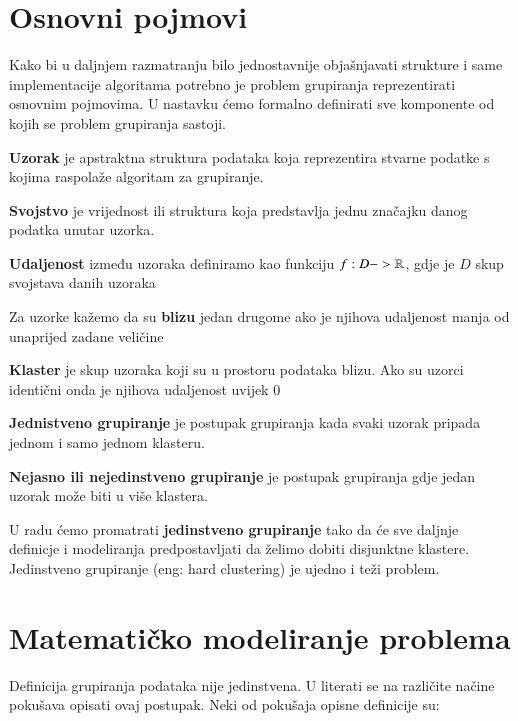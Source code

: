 \documentclass[a4paper,twoside,12pt]{memoir} %
\begin{document}
\section[Osnovni pojmovi][os-pojmovi]{Osnovni pojmovi}
\label{sec:os-pojmovi}
Kako bi u daljnjem razmatranju bilo jednostavnije objašnjavati strukture i same implementacije algoritama potrebno je problem grupiranja reprezentirati osnovnim pojmovima. U nastavku ćemo formalno definirati sve komponente od kojih se problem grupiranja sastoji.
\begin{defn}
\label{def:uzorak}
\textbf{Uzorak} je apstraktna struktura podataka koja reprezentira stvarne podatke s kojima raspolaže algoritam za grupiranje.
\end{defn}
\begin{defn}
\label{def:svojstvo}
\textbf{Svojstvo} je vrijednost ili struktura koja predstavlja jednu značajku danog podatka unutar uzorka.
\end{defn}
\begin{defn}
\label{def:udaljenost}
\textbf{Udaljenost} između uzoraka definiramo kao funkciju 
$f: D  -> \mathbb{R}$, gdje je $D$ skup svojstava danih uzoraka
\end{defn}
\begin{defn}
\label{def:blizina}
Za uzorke kažemo da su \textbf{blizu} jedan drugome ako je njihova udaljenost manja od unaprijed zadane veličine
\end{defn}
\begin{defn}
\label{def:klaster}
\textbf{Klaster} je skup uzoraka koji su u prostoru podataka blizu. Ako su uzorci identični onda je njihova udaljenost uvijek $0$
\end{defn}
\begin{defn}
\label{def:hard}
\textbf{Jednistveno grupiranje} je postupak grupiranja kada svaki uzorak pripada jednom i samo jednom klasteru.
\end{defn}
\begin{defn}
\label{def:fuzzy}
\textbf{Nejasno ili nejedinstveno grupiranje} je postupak grupiranja gdje jedan uzorak može biti u više klastera.
\end{defn}
\begin{rem}
U radu ćemo promatrati \textbf{jedinstveno grupiranje} tako da će sve daljnje definicje i modeliranja predpostavljati da želimo dobiti disjunktne klastere. Jedinstveno grupiranje (eng: hard clustering) je ujedno i teži problem.
\end{rem}

\section[Matematičko modeliranje problema][MMP]{Matematičko modeliranje problema}
Definicija grupiranja podataka nije jedinstvena. U literati se na različite načine pokušava opisati ovaj postupak. Neki od pokušaja opisne definicije su:
\end{document}

